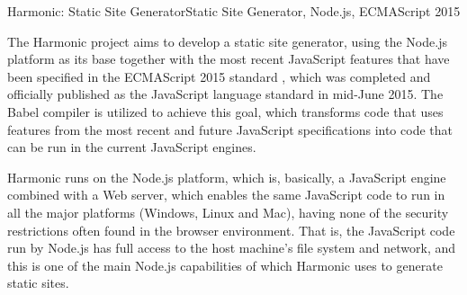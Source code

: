 \documentclass[ppginf, pep]{esinucpel}
\begin{document}
\begin{abstract}

O projeto Harmonic tem por objetivo desenvolver um gerador de sites estáticos, utilizando como base a plataforma Node.js juntamente com os recursos mais recentes da linguagem JavaScript que foram especificados no padrão ECMAScript 2015 \cite{es2015}, o qual foi finalizado e oficializado como padrão da linguagem JavaScript em meados de junho de 2015. O compilador Babel é utilizado para atingir este objetivo, o qual transforma código que utiliza recursos de especificações recentes e futuras do JavaScript em código que pode ser executado nos motores JavaScript atuais.

O Harmonic roda sobre a plataforma Node.js, que é, de forma resumida, um motor JavaScript combinado com servidor Web, que permite execução do mesmo código JavaScript em todas as principais plataformas (Windows, Linux e Mac), sem possuir as restrições de segurança comumente encontradas no ambiente de navegadores. Ou seja, o código JavaScript executado pelo Node.js tem acesso completo ao sistema de arquivos e rede da máquina hospedeira, e esta é uma das principais capacidades do Node.js das quais o Harmonic utiliza para gerar sites estáticos.

\end{abstract}

\begin{englishabstract}{Harmonic: Static Site Generator}{Static Site Generator, Node.js, ECMAScript 2015}

The Harmonic project aims to develop a static site generator, using the Node.js platform as its base together with the most recent JavaScript features that have been specified in the ECMAScript 2015 standard \cite{es2015}, which was completed and officially published as the JavaScript language standard in mid-June 2015. The Babel compiler is utilized to achieve this goal, which transforms code that uses features from the most recent and future JavaScript specifications into code that can be run in the current JavaScript engines.

Harmonic runs on the Node.js platform, which is, basically, a JavaScript engine combined with a Web server, which enables the same JavaScript code to run in all the major platforms (Windows, Linux and Mac), having none of the security restrictions often found in the browser environment. That is, the JavaScript code run by Node.js has full access to the host machine's file system and network, and this is one of the main Node.js capabilities of which Harmonic uses to generate static sites.

\end{englishabstract}
\end{document}
